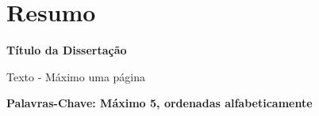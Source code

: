 \chapter{Resumo}
\begin{center}
\textbf{Título da Dissertação}
\end{center}

Texto - Máximo uma página \newline

\textbf{Palavras-Chave: Máximo 5, ordenadas alfabeticamente}
